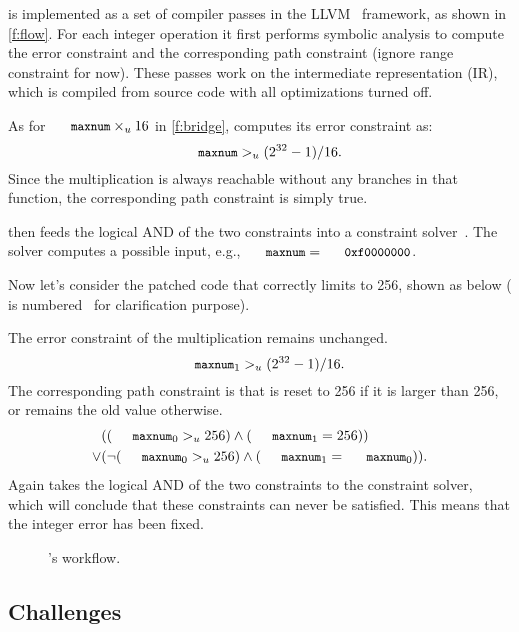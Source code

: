 \sys is implemented as a set of compiler passes in the
LLVM~\cite{lattner:llvm} framework, as shown in \autoref{f:flow}.
For each integer operation it first performs symbolic analysis to
compute the error constraint and the corresponding path constraint
(ignore range constraint for now).  These passes work on the
intermediate representation (IR), which is compiled from source
code with all optimizations turned off.

As for $\cc{maxnum} \times_u 16$ in \autoref{f:bridge}, \sys computes
its error constraint as:
\begin{equation*}
\cc{maxnum} >_u (2^{32} - 1) / 16.
\end{equation*}
Since the multiplication is always reachable without any branches
in that function, the corresponding path constraint is simply true.

\sys then feeds the logical AND of the two constraints into a
constraint solver~\cite{boolector}.  The solver computes a possible
input, e.g., $\cc{maxnum} = \cc{0xf0000000}$.

Now let's consider the patched code that correctly limits 
to 256, shown as below ( is
numbered~\cite[\chapterautorefname~8.11]{whale} for clarification
purpose).

The error constraint of the multiplication remains unchanged.
\begin{equation*}
\cc{maxnum}_1 >_u (2^{32} - 1) / 16.
\end{equation*}
The corresponding path constraint is that  is reset to 256
if it is larger than 256, or remains the old value otherwise.
\begin{align*}
& ((\cc{maxnum}_0 >_u 256) \land (\cc{maxnum}_1 = 256)) \\
\lor
& (\neg (\cc{maxnum}_0 >_u 256) \land (\cc{maxnum}_1 = \cc{maxnum}_0)).
\end{align*}
Again \sys takes the logical AND of the two constraints to the
constraint solver, which will conclude that these constraints can
never be satisfied.  This means that the integer error has been
fixed.

\begin{figure}
\centering
\resizebox{0.9\linewidth}{!}{

}
\caption{\sys's workflow.}
\label{f:flow}
\end{figure}


\subsection{Challenges}
\label{s:chal}

